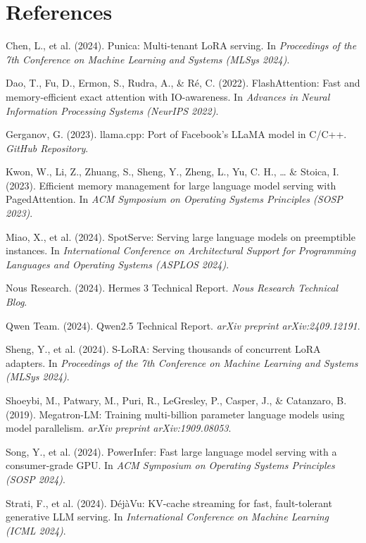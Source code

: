 \documentclass[11pt,a4paper]{article}
\begin{document}
\section*{References}
\begin{enumerate}[leftmargin=2em,label={[\arabic*]},itemsep=3pt]
\item Chen, L., et al. (2024). Punica: Multi-tenant LoRA serving. In \textit{Proceedings of the 7th Conference on Machine Learning and Systems (MLSys 2024)}.
\item Dao, T., Fu, D., Ermon, S., Rudra, A., \& R\'e, C. (2022). FlashAttention: Fast and memory-efficient exact attention with IO-awareness. In \textit{Advances in Neural Information Processing Systems (NeurIPS 2022)}.
\item Gerganov, G. (2023). llama.cpp: Port of Facebook's LLaMA model in C/C++. \textit{GitHub Repository}.
\item Kwon, W., Li, Z., Zhuang, S., Sheng, Y., Zheng, L., Yu, C. H., \ldots{} \& Stoica, I. (2023). Efficient memory management for large language model serving with PagedAttention. In \textit{ACM Symposium on Operating Systems Principles (SOSP 2023)}.
\item Miao, X., et al. (2024). SpotServe: Serving large language models on preemptible instances. In \textit{International Conference on Architectural Support for Programming Languages and Operating Systems (ASPLOS 2024)}.
\item Nous Research. (2024). Hermes 3 Technical Report. \textit{Nous Research Technical Blog}.
\item Qwen Team. (2024). Qwen2.5 Technical Report. \textit{arXiv preprint arXiv:2409.12191}.
\item Sheng, Y., et al. (2024). S-LoRA: Serving thousands of concurrent LoRA adapters. In \textit{Proceedings of the 7th Conference on Machine Learning and Systems (MLSys 2024)}.
\item Shoeybi, M., Patwary, M., Puri, R., LeGresley, P., Casper, J., \& Catanzaro, B. (2019). Megatron-LM: Training multi-billion parameter language models using model parallelism. \textit{arXiv preprint arXiv:1909.08053}.
\item Song, Y., et al. (2024). PowerInfer: Fast large language model serving with a consumer-grade GPU. In \textit{ACM Symposium on Operating Systems Principles (SOSP 2024)}.
\item Strati, F., et al. (2024). D\'ej\`aVu: KV-cache streaming for fast, fault-tolerant generative LLM serving. In \textit{International Conference on Machine Learning (ICML 2024)}.

\end{enumerate}
\end{document}
